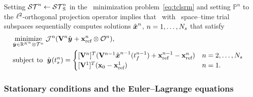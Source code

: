 Setting $\mathcal{ ST }^n \leftarrow \mathcal{ ST }_{\text{S}}^{n}$ in the
\methodAcronym\ minimization problem~\eqref{eq:tclsrm} and setting 
$\mathbb{P}^n$ to the 
$\ell^2$-orthogonal projection operator 
implies that 
\methodAcronym\ with \spatialAcronym\ space--time trial subspaces
sequentially computes solutions
$\hat{ \boldsymbol x}^{n}$, $n = 1,\ldots,N_s$ that satisfy
\begin{equation}\label{eq:obj_gen_slab}
\begin{split}
	& \underset{\genstateyArgnt{} \in \RR{\romdimArg{n}} \otimes \timeSpaceArg{n}
			}{\text{minimize}}\; \mathcal{J}^n(\basismatArg{n} \genstateyArgnt{} +
			\stateInterceptArg{n} \otimes \onesFunction^n), \\ 
      & \text{subject to }\; \genstateyArg{}{\timeStartArg{n}} =
	\begin{cases}
\spatialIC & n = 2,\ldots,\nslabs \\
\genstateICOne & n=1. \end{cases} 
\end{split}
\end{equation}

\subsubsection{Stationary conditions and the Euler--Lagrange equations}

